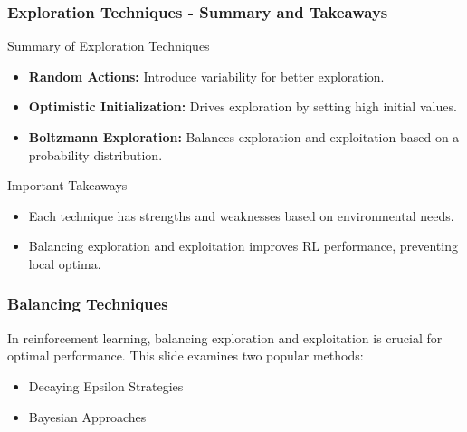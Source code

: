 \documentclass[aspectratio=169]{beamer}
\begin{document}
\begin{frame}[fragile]
    \frametitle{Exploration Techniques - Summary and Takeaways}
    \begin{block}{Summary of Exploration Techniques}
        \begin{itemize}
            \item \textbf{Random Actions:} Introduce variability for better exploration.
            \item \textbf{Optimistic Initialization:} Drives exploration by setting high initial values.
            \item \textbf{Boltzmann Exploration:} Balances exploration and exploitation based on a probability distribution.
        \end{itemize}
    \end{block}
    \begin{block}{Important Takeaways}
        \begin{itemize}
            \item Each technique has strengths and weaknesses based on environmental needs.
            \item Balancing exploration and exploitation improves RL performance, preventing local optima.
        \end{itemize}
    \end{block}
\end{frame}

\begin{frame}[fragile]
    \frametitle{Balancing Techniques}
    In reinforcement learning, balancing exploration and exploitation is crucial for optimal performance. 
    This slide examines two popular methods:
    \begin{itemize}
        \item Decaying Epsilon Strategies
        \item Bayesian Approaches
    \end{itemize}
\end{frame}
\end{document}
